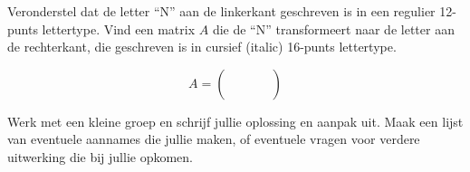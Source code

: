 \documentclass{ximera}
\begin{document}
\author{Alexander Holvoet}


\begin{problem}
Veronderstel dat de letter ``N'' aan de linkerkant geschreven is in een regulier 12-punts lettertype. Vind een matrix $A$ die de ``N'' transformeert naar de letter aan de rechterkant, die geschreven is in cursief (italic) 16-punts lettertype.

\begin{center}
\end{center}

$$A = \begin{pmatrix} \phantom{00} & \phantom{00} \\ \phantom{00} & \phantom{00} \end{pmatrix}$$

Werk met een kleine groep en schrijf jullie oplossing en aanpak uit. Maak een lijst van eventuele aannames die jullie maken, of eventuele vragen voor verdere uitwerking die bij jullie opkomen.
\end{problem}
\end{document}
